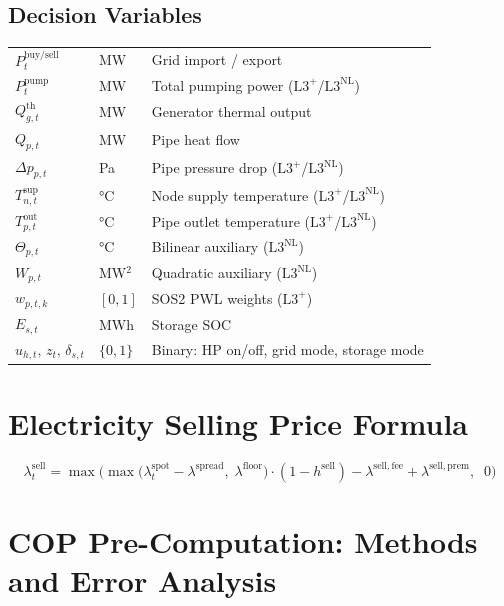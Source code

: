 \documentclass[review,3p]{elsarticle}
\newcommand{\Lplus}{\mathrm{L3}^{+}}
\newcommand{\Lnl}{\mathrm{L3}^{\mathrm{NL}}}
\begin{document}
\subsection*{Decision Variables}
\begin{tabular}{@{}p{2.8cm}p{2.0cm}p{7.5cm}@{}}
$P_t^{\mathrm{buy/sell}}$     & MW      & Grid import / export \\
$P_t^{\mathrm{pump}}$         & MW      & Total pumping power
  ($\Lplus$/$\Lnl$) \\
$Q_{g,t}^{\mathrm{th}}$      & MW      & Generator thermal output \\
$Q_{p,t}$                    & MW      & Pipe heat flow \\
$\Delta p_{p,t}$             & Pa      & Pipe pressure drop
  ($\Lplus$/$\Lnl$) \\
$T_{n,t}^{\mathrm{sup}}$     & \si{\celsius} & Node supply temperature
  ($\Lplus$/$\Lnl$) \\
$T_{p,t}^{\mathrm{out}}$     & \si{\celsius} & Pipe outlet temperature
  ($\Lplus$/$\Lnl$) \\
$\Theta_{p,t}$               & \si{\celsius} & Bilinear auxiliary
  ($\Lnl$) \\
$W_{p,t}$                    & MW$^2$  & Quadratic auxiliary ($\Lnl$) \\
$w_{p,t,k}$                  & $[0,1]$ & SOS2 PWL weights ($\Lplus$) \\
$E_{s,t}$                    & MWh     & Storage SOC \\
$u_{h,t},\, z_t,\, \delta_{s,t}$ & $\{0,1\}$
  & Binary: HP on/off, grid mode, storage mode \\
\end{tabular}

\section{Electricity Selling Price Formula}
\label{app:selling_price}

\begin{equation}
\lambda_t^{\mathrm{sell}} = \max\!\Bigg(\!
\max\!\big(\lambda_t^{\mathrm{spot}} - \lambda^{\mathrm{spread}},\;
\lambda^{\mathrm{floor}}\big)
\cdot (1 - h^{\mathrm{sell}})
- \lambda^{\mathrm{sell,fee}} + \lambda^{\mathrm{sell,prem}},
\;\; 0\Bigg)
\end{equation}

\section{COP Pre-Computation: Methods and Error Analysis}
\label{app:cop}
\end{document}
